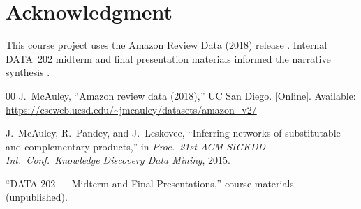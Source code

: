 \documentclass[conference]{IEEEtran}
\begin{document}
\section*{Acknowledgment}
This course project uses the Amazon Review Data (2018) release \cite{mcauley2018}. Internal DATA~202 midterm and final presentation materials informed the narrative synthesis \cite{data202slides}.

\begin{thebibliography}{00}
J.~McAuley, ``Amazon review data (2018),'' UC San Diego. [Online]. Available: \url{https://cseweb.ucsd.edu/~jmcauley/datasets/amazon_v2/}

J.~McAuley, R.~Pandey, and J.~Leskovec, ``Inferring networks of substitutable and complementary products,'' in \emph{Proc.\ 21st ACM SIGKDD Int.\ Conf.\ Knowledge Discovery Data Mining}, 2015.

``DATA 202 --- Midterm and Final Presentations,'' course materials (unpublished).
\end{thebibliography}
\end{document}
